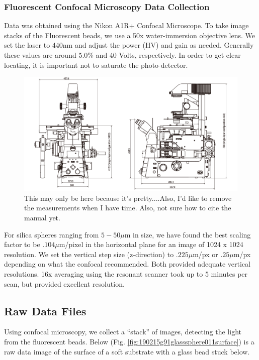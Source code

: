 \subsubsection{Fluorescent Confocal Microscopy Data Collection}
Data was obtained using the Nikon A1R+ Confocal Microscope. To take image stacks of the Fluorescent beads, we use a 50x water-immersion objective lens. We set the laser to 440nm and adjust the power (HV) and gain as needed. Generally these values are around 5.0\% and 40 Volts, respectively. In order to get clear locating, it is important not to saturate the photo-detector. 

\begin{figure}
	\centering
	\includegraphics[width=0.8\linewidth]{confocal_stuff/Ti2_diagram_1}
	\caption[Nikon Ti2 Microscope Base]{This may only be here because it's pretty....Also, I'd like to remove the measurements when I have time. Also, not sure how to cite the manual yet.}
	\label{fig:ti2diagram1}
\end{figure}

For silica spheres ranging from $5-50 \mu$m in size, we have found the best scaling factor to be $.104 \mu$m/pixel in the horizontal plane for an image of 1024 x 1024 resolution. We set the vertical step size (z-direction) to $.225 \mu$m/px or $.25 \mu$m/px depending on what the confocal recommended. Both provided adequate vertical resolutions. 16x averaging using the resonant scanner took up to 5 minutes per scan, but provided excellent resolution. 

\subsection{Raw Data Files}
Using confocal microscopy, we collect a ``stack'' of images, detecting the light from the fluorescent beads. Below (Fig. \ref{fig:190215g91glasssphere011surface}) is a raw data image of the surface of a soft substrate with a glass bead stuck below.

